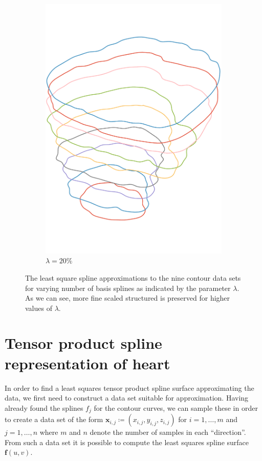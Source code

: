 \documentclass[article]{memoir}
\newcommand{\x}{\mathbf{x}}
\newcommand{\f}{\mathbf{f}}
\begin{document}
\begin{figure}[htbp]
\begin{subfigure}{0.32\textwidth}
        \includegraphics[width=\linewidth]{../images/curves_lambda_20_cropped.pdf}
        \caption{\( \lambda = 20 \% \)}
    \end{subfigure}
    \caption{The least square spline approximations to the nine contour data
    sets for varying number of basis splines as indicated by the parameter \(
    \lambda \). As we can see, more fine scaled structured is preserved for higher
    values of \( \lambda \).}
    \label{fig:contours}
\end{figure}

\chapter{Tensor product spline representation of heart}
\label{cha:tensor_product_spline_representation_of_heart}

In order to find a least squares tensor product spline surface approximating
the data, we first need to construct a data set suitable for approximation.
Having already found the splines \( f_j \) for the contour curves, we can
sample these in order to create a data set of the form \( \x_{i, j} \coloneqq
(x_{i, j}, y_{i, j}, z_{i, j})\) for \(i = 1, \dots, m \) and \(j = 1, \dots, n
\) where \(m\) and \(n\) denote the number of samples in each ``direction''.
From such a data set it is possible to compute the least squares spline surface
\( \f(u, v) \).
\end{document}

